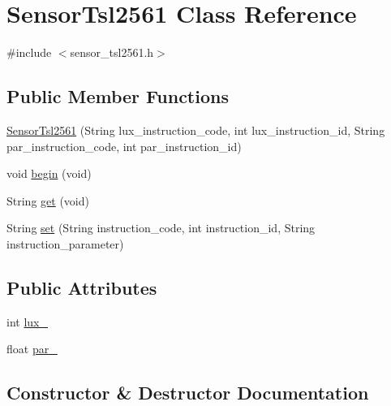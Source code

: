 \hypertarget{class_sensor_tsl2561}{}\section{Sensor\+Tsl2561 Class Reference}
\label{class_sensor_tsl2561}


{\ttfamily \#include $<$sensor\+\_\+tsl2561.\+h$>$}

\subsection*{Public Member Functions}
\begin{DoxyCompactItemize}
\item 
\hyperlink{class_sensor_tsl2561_acb66b0b6127d1d889ff31085dbb9d8c2}{Sensor\+Tsl2561} (String lux\+\_\+instruction\+\_\+code, int lux\+\_\+instruction\+\_\+id, String par\+\_\+instruction\+\_\+code, int par\+\_\+instruction\+\_\+id)
\item 
void \hyperlink{class_sensor_tsl2561_ace17c892222366185df021bda708cc10}{begin} (void)
\item 
String \hyperlink{class_sensor_tsl2561_a1d9dff52af755218abca50f9025f0f5c}{get} (void)
\item 
String \hyperlink{class_sensor_tsl2561_ab4eb3d8197c96867f43857876df46b33}{set} (String instruction\+\_\+code, int instruction\+\_\+id, String instruction\+\_\+parameter)
\end{DoxyCompactItemize}
\subsection*{Public Attributes}
\begin{DoxyCompactItemize}
\item 
int \hyperlink{class_sensor_tsl2561_ae12c0a6210834b63eb786e81043c38c4}{lux\+\_\+}
\item 
float \hyperlink{class_sensor_tsl2561_a1159f0229bf7cfc07da35366f81661f7}{par\+\_\+}
\end{DoxyCompactItemize}


\subsection{Constructor \& Destructor Documentation}
\hypertarget{class_sensor_tsl2561_acb66b0b6127d1d889ff31085dbb9d8c2}{}
